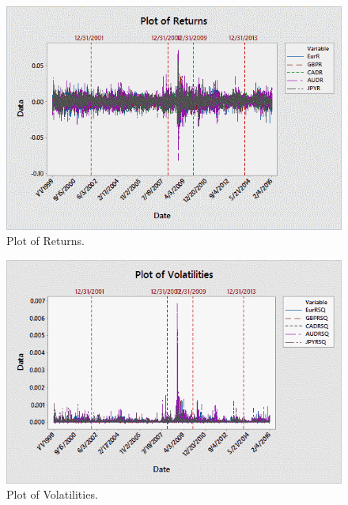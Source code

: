 	\begin{figure}[!ht]
	\centering
	\includegraphics[width=\textwidth]{chapters/chapter_mvts/figures/preturns.png}
	\caption{Plot of Returns. \label{fig:preturns}}
	\end{figure}
	
	\begin{figure}[!ht]
	\centering
	\includegraphics[width=\textwidth]{chapters/chapter_mvts/figures/pvolat.png}
	\caption{Plot of Volatilities. \label{fig:pvolat}}
	\end{figure}

